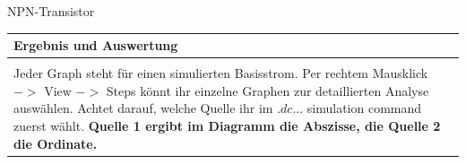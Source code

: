\begin{frame}[t]{NPN-Transistor}
  \begin{spacing}{0.9} \begin{tiny}
      \begin{table}[h!]
        \begin{tabular}{p{10cm} }
          \hline
          \textbf{Ergebnis und Auswertung} \\
          \hline                           \\
          Jeder Graph steht für einen simulierten Basisstrom. Per rechtem Mausklick $->$ View $->$ Steps könnt ihr einzelne Graphen zur
          detaillierten Analyse auswählen. \newline\newline Achtet darauf, welche Quelle ihr im $.dc ...$ simulation command zuerst wählt. \textbf{Quelle 1 ergibt im Diagramm die Abszisse, die Quelle 2 die Ordinate.}
        \end{tabular}
      \end{table}
    \end{tiny} \end{spacing}

\end{frame}

